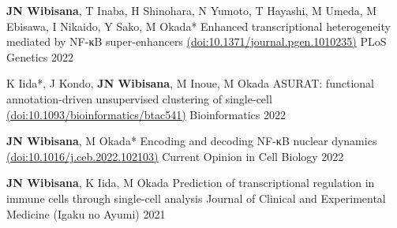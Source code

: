 \begin{cventries}
  \cventrypub
    {\textbf{JN Wibisana}, T Inaba, H Shinohara, N Yumoto, T Hayashi, M Umeda, M Ebisawa, I Nikaido, Y Sako, M Okada*} %
    {Enhanced transcriptional heterogeneity mediated by NF-κB super-enhancers \href{https://doi.org/10.1371/journal.pgen.1010235}{(doi:10.1371/journal.pgen.1010235)}} %
    {PLoS Genetics} %
    {2022} %

  \cventrypublast
    {K Iida*, J Kondo, \textbf{JN Wibisana}, M Inoue, M Okada} %
    {ASURAT: functional annotation-driven unsupervised clustering of single-cell \href{https://doi.org/10.1093/bioinformatics/btac541}{(doi:10.1093/bioinformatics/btac541)}} %
    {Bioinformatics} %
    {2022} %


\end{cventries}

\vspace{-0.5em}

\begin{cventries}

  \cventrypub
    {\textbf{JN Wibisana}, M Okada*} %
    {Encoding and decoding NF-κB nuclear dynamics \href{https://doi.org/10.1016/j.ceb.2022.102103}{(doi:10.1016/j.ceb.2022.102103)}} %
    {Current Opinion in Cell Biology} %
    {2022} %

  \cventrypublast
    {\textbf{JN Wibisana}, K Iida, M Okada} %
    {Prediction of transcriptional regulation in immune cells through single-cell analysis} %
    {Journal of Clinical and Experimental Medicine (Igaku no Ayumi)} %
    {2021} %


\end{cventries}

\vspace{-0.5em}

